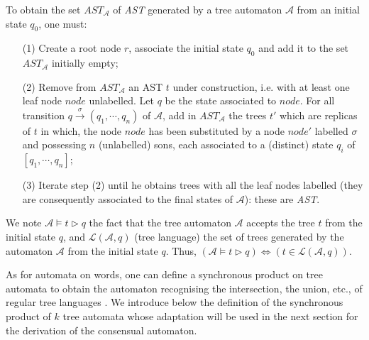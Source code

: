 To obtain the set $AST_\mathcal{A}$ of \textit{AST} generated by a tree automaton $\mathcal{A}$ from an initial state $q_0$, one must:
\begin{itemize}
	\item[(1)] Create a root node $r$, associate the initial state $q_0$ and add it to the set $AST_\mathcal{A}$ initially empty;
	\item[(2)] Remove from $AST_\mathcal{A}$ an AST $t$ under construction, i.e. with at least one leaf node $node$ unlabelled. Let $q$ be the state associated to $node$.
	For all transition $q\stackrel{\sigma}{\rightarrow} \left(q_1,\cdots,q_n\right)$   of $\mathcal{A}$, add in $AST_\mathcal{A}$ the trees $t'$ which are replicas of $t$ in which, the node $node$ has been substituted by a node $node'$ labelled $\sigma$ and possessing $n$ (unlabelled) sons, each associated to a (distinct) state $q_i$ of $[ q_1,\cdots,q_n]$; 
	\item[(3)] Iterate step (2) until he obtains trees with all the leaf nodes labelled (they are consequently associated to the final states of $\mathcal{A}$): these are \textit{AST}.
\end{itemize}
We note $\mathcal{A} \models t \triangleright q$ the fact that the tree automaton $\mathcal{A}$ accepts the tree $t$ from the initial state $q$, and
 $\mathscr{L}(\mathcal{A}, q)$ (tree language) the set of trees generated by the automaton $\mathcal{A}$ from the initial state $q$. 
Thus, $ \left(\mathcal{A}  \models t \triangleright q \right) \Leftrightarrow \left( t \in \mathscr{L}(\mathcal{A}, q) \right)$.


As for automata on words, one can define a synchronous product on tree automata to obtain the automaton recognising the intersection, the union, etc., of regular tree languages \cite{Comon}. We introduce below the definition of the synchronous product of $k$ tree automata whose adaptation will be used in the next section for the derivation of the consensual automaton. 

